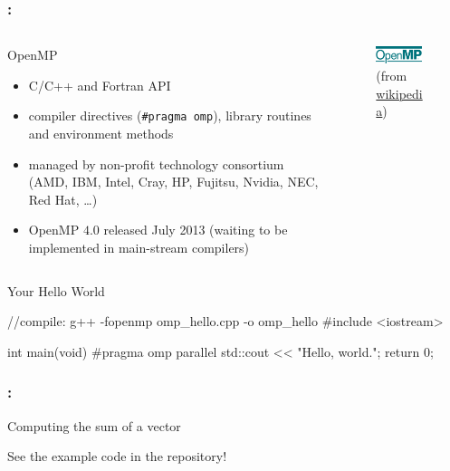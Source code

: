 \documentclass[9pt,xcolor=table]{beamer}
\begin{document}
\begin{frame}[fragile]
\frametitle{\insertsectionhead{}: \insertsubsectionhead{}}
\begin{columns}[c]
  \begin{column}{.82\textwidth}
    \begin{block}{OpenMP}
      \begin{itemize}
      \item C/C++ and Fortran API
      \item compiler directives (\texttt{\#pragma omp}), library routines and environment methods
      \item managed by non-profit technology consortium (AMD, IBM, Intel, Cray, HP, Fujitsu, Nvidia, NEC, Red Hat, \dots{})
      \item OpenMP $4.0$ released July 2013 (waiting to be implemented in main-stream compilers)
      \end{itemize}
    \end{block}
  \end{column}
    \begin{column}{.25\textwidth}
      \begin{figure}[htb]
        \includegraphics[width=0.9\textwidth]{img/Openmp}\\[2pt]\small
        (from \href{http://en.wikipedia.org/wiki/Openmp}{wikipedia})
      \end{figure}
    \end{column}
  \end{columns}
\pause
\begin{block}{Your Hello World}
  \begin{pyglist}[language=c++,numbers=left,style=emacs]
//compile: g++ -fopenmp omp_hello.cpp -o omp_hello
#include <iostream>

int main(void)
{
  #pragma omp parallel
  std::cout << "Hello, world.\n";
  return 0;
}
  \end{pyglist}
\end{block}
\end{frame}


\begin{frame}
\frametitle{\insertsectionhead{}: \insertsubsectionhead{}}
\begin{block}{Computing the sum of a vector}
  \vfill
  \begin{center}
    \huge See the example code in the repository!
  \end{center}
  \vfill
\end{block}
\end{frame}
\end{document}
